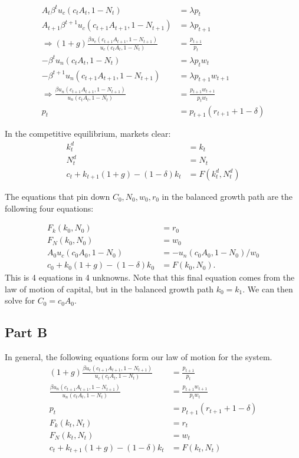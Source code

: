 \documentclass[11pt]{article} %
\begin{document}
\begin{align*}
A_t\beta^tu_c(c_tA_t,1-N_t) &= \lambda p_t\\
A_{t+1}\beta^{t+1}u_c(c_{t+1}A_{t+1},1-N_{t+1}) &= \lambda p_{t+1}\\
\Rightarrow (1+g)\frac{\beta u_c(c_{t+1}A_{t+1},1-N_{t+1})}{ u_c(c_tA_t,1-N_t)} &= \frac{p_{t+1}}{p_t}\\
-\beta^tu_n(c_tA_t,1-N_t) &= \lambda p_tw_t \\
-\beta^{t+1}u_n(c_{t+1}A_{t+1},1-N_{t+1}) &= \lambda p_{t+1}w_{t+1}\\
\Rightarrow \frac{\beta u_n(c_{t+1}A_{t+1},1-N_{t+1}) }{u_n(c_tA_t,1-N_t)} &= \frac{p_{t+1} w_{t+1}}{p_t w_t}\\
p_t &= p_{t+1}(r_{t+1} + 1-\delta)
\end{align*}

In the competitive equilibrium, markets clear:
\begin{align*}
k_t^d &= k_t\\
N_t^d &= N_t\\
c_t + k_{t+1}(1+g) - (1-\delta)k_{t} &= F(k_t^d,N_t^d)
\end{align*}

The equations that pin down $C_0,N_0,w_0,r_0$ in the balanced growth path are the following four equations:

\begin{align*}
F_k(k_0,N_0) &= r_0\\
F_N(k_0,N_0) &= w_0\\
A_0 u_c (c_0 A_0, 1-N_0) &= - u_n (c_0A_0,1-N_0) / w_0\\
c_0 + k_0(1+g) - (1-\delta)k_0 &= F(k_0,N_0).
\end{align*}
This is 4 equations in 4 unknowns. Note that this final equation comes from the law of motion of capital, but in the balanced growth path $k_0 = k_1$. We can then solve for $C_0 = c_0A_0$.


\subsection{Part B}
In general, the following equations form our law of motion for the system.
\begin{align}
(1+g)\frac{\beta u_c(c_{t+1}A_{t+1},1-N_{t+1})}{ u_c(c_tA_t,1-N_t)} &= \frac{p_{t+1}}{p_t} \label{ceuler} \\
\frac{\beta u_n(c_{t+1}A_{t+1},1-N_{t+1}) }{u_n(c_tA_t,1-N_t)} &= \frac{p_{t+1} w_{t+1}}{p_t w_t}\label{neuler}\\
p_t &= p_{t+1}(r_{t+1} + 1-\delta) \label{arbitrage} \\ 
F_k(k_t,N_t) &= r_t\\
F_N(k_t,N_t) &= w_t \\
c_t + k_{t+1}(1+g) - (1-\delta)k_{t} &= F(k_t,N_t)
\end{align}
\end{document}
